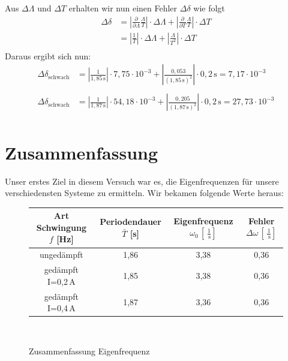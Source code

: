 \documentclass[fontsize=12pt]{scrartcl}
\renewcommand{\l}{\left\vert}
\renewcommand{\r}{\right\vert}
\begin{document}
Aus $\Delta\Lambda$ und $\Delta T$ erhalten wir nun einen Fehler $\Delta\delta$ wie folgt
\begin{align*}
\Delta\delta &= \l\frac{\partial}{\partial  \Lambda } \frac{ \Lambda }{T} \r  \cdot \Delta \Lambda +  \l\frac{\partial}{\partial T} \frac{ \Lambda }{T} 
\r\cdot \Delta T \\
&= \l  \frac{ 1}{T} \r  \cdot \Delta \Lambda +  \l  \frac{ \Lambda }{T^2}  \r\cdot \Delta T \\
\end{align*}
Daraus ergibt sich nun:
\begin{align*}
\Delta\delta_{\text{schwach}}&= \l  \frac{ 1}{1,85\,\text{s}} \r  \cdot 7,75\cdot 10^{-3} +  \l  \frac{ 0,053}{(1,85\,\text{s})^2}  \r\cdot 0,2\,\text{s}=7,17\cdot 10^{-3}
 \\
~\\
\Delta\delta_{\text{schwach}} &= \l  \frac{ 1}{1,87\,\text{s}} \r  \cdot 54,18\cdot 10^{-3} +  \l  \frac{ 0,205}{(1,87\,\text{s})^2}  \r\cdot 0,2\,\text{s}=27,73\cdot 10^{-3}
 \\
\end{align*}

\newpage

\section{Zusammenfassung}

Unser erstes Ziel in diesem Versuch war es, die Eigenfrequenzen für unsere verschiedensten Systeme zu ermitteln. Wir bekamen folgende Werte heraus:
\begin{figure}[H]
\caption{Zusammenfassung Eigenfrequenz}
\centering
\begin{tabular}{c|c|c|c} \hline
Art Schwingung $f$ [Hz] & Periodendauer $\bar{T} $	[s] & Eigenfrequenz $\omega_0\,[\,\frac{1}{\,\text{s}}]$  & Fehler $\Delta \omega \,[\,\frac{1}{\,\text{s}}]$ \\ \hline
ungedämpft &1,86	&3,38&0,36 \\ \hline
gedämpft I=0,2\,A&1,85&	3,38 &0,36\\ \hline
gedämpft I=0,4\,A&1,87&	3,36 &0,36\\
\end{tabular} \\
\end{figure}
\end{document}
